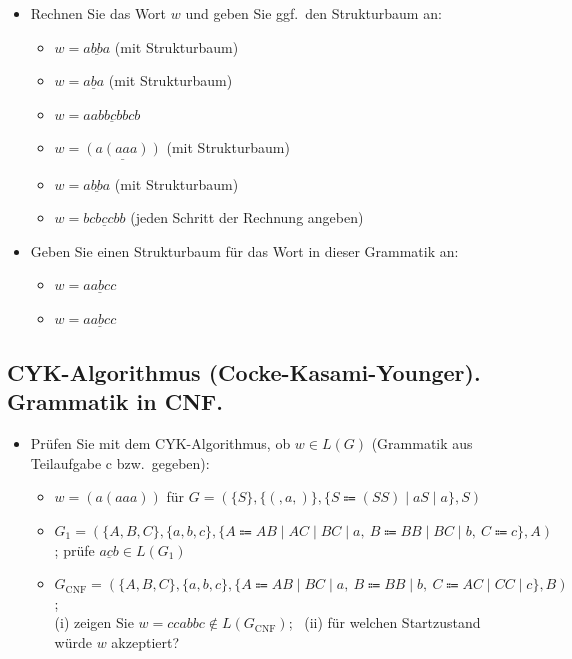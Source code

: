 \begin{itemize}
    \item Rechnen Sie das Wort $w$ und geben Sie ggf.\ den Strukturbaum an:
    \begin{itemize}
        \item  $w=\underline{abba}$ (mit Strukturbaum) 
        \item  $w=\underline{aba}$ (mit Strukturbaum) 
        \item  $w=\underline{aabbcbbcb}$ 
        \item  $w=\underline{(a(aaa))}$ (mit Strukturbaum) 
        \item $w=\underline{abba}$ (mit Strukturbaum) 
        \item  $w=\underline{bcbccbb}$ (jeden Schritt der Rechnung angeben) 
    \end{itemize}
    \item Geben Sie einen Strukturbaum für das Wort in dieser Grammatik an:
    \begin{itemize}
        \item  $w=\underline{aabcc}$ 
        \item $w=\underline{aabcc}$  
    \end{itemize}
\end{itemize}

\subsection{CYK-Algorithmus (Cocke-Kasami-Younger). Grammatik in CNF.}
\begin{itemize}
    \item Prüfen Sie mit dem CYK-Algorithmus, ob $w\in L(G)$ (Grammatik aus Teilaufgabe c bzw.\ gegeben):
    \begin{itemize}
        \item  $w=(a(aaa))$ für $G=(\{S\},\{(,a,)\},\{S\Coloneqq(SS)\mid aS\mid a\},S)$ 
        \item $G_1=(\{A,B,C\},\{a,b,c\},\{A\Coloneqq AB\mid AC\mid BC\mid a,\ B\Coloneqq BB\mid BC\mid b,\ C\Coloneqq c\},A)$; prüfe $\underline{acb}\in L(G_1)$ 
        \item $G_{\mathrm{CNF}}=(\{A,B,C\},\{a,b,c\},\{A\Coloneqq AB\mid BC\mid a,\ B\Coloneqq BB\mid b,\ C\Coloneqq AC\mid CC\mid c\},B)$;\\
        (i) zeigen Sie $w=ccabbc\notin L(G_{\mathrm{CNF}})$; \ (ii) für welchen Startzustand würde $w$ akzeptiert? 
    \end{itemize}
\end{itemize}


